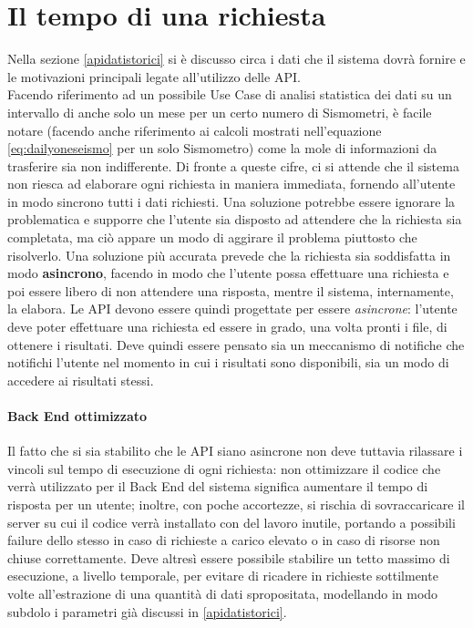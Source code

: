 \section{Il tempo di una richiesta} \label{moledati}
Nella sezione \ref{apidatistorici} si è discusso circa i dati che il sistema dovrà fornire e le motivazioni principali legate all'utilizzo delle API. \\
Facendo riferimento ad un possibile Use Case di analisi statistica dei dati su un intervallo di anche solo un mese per un certo numero di Sismometri, è facile notare (facendo anche riferimento ai calcoli mostrati nell'equazione \ref{eq:dailyoneseismo} per un solo Sismometro) come la mole di informazioni da trasferire sia non indifferente.
Di fronte a queste cifre, ci si attende che il sistema non riesca ad elaborare ogni richiesta in maniera immediata, fornendo all'utente in modo sincrono tutti i dati richiesti. Una soluzione potrebbe essere ignorare la problematica e supporre che l'utente sia disposto ad attendere che la richiesta sia completata, ma ciò appare un modo di aggirare il problema piuttosto che risolverlo. Una soluzione più accurata prevede che la richiesta sia soddisfatta in modo \textbf{asincrono}, facendo in modo che l'utente possa effettuare una richiesta e poi essere libero di non attendere una risposta, mentre il sistema, internamente, la elabora. Le API devono essere quindi progettate per essere \textit{asincrone}: l'utente deve poter effettuare una richiesta ed essere in grado, una volta pronti i file, di ottenere i risultati. Deve quindi essere pensato sia un meccanismo di notifiche che notifichi l'utente nel momento in cui i risultati sono disponibili, sia un modo di accedere ai risultati stessi.

\paragraph{Back End ottimizzato}
Il fatto che si sia stabilito che le API siano asincrone non deve tuttavia rilassare i vincoli sul tempo di esecuzione di ogni richiesta: non ottimizzare il codice che verrà utilizzato per il Back End del sistema significa aumentare il tempo di risposta per un utente; inoltre, con poche accortezze, si rischia di sovraccaricare il server su cui il codice verrà installato con del lavoro inutile, portando a possibili failure dello stesso in caso di richieste a carico elevato o in caso di risorse non chiuse correttamente. Deve altresì essere possibile stabilire un tetto massimo di esecuzione, a livello temporale, per evitare di ricadere in richieste sottilmente volte all'estrazione di una quantità di dati spropositata, modellando in modo subdolo i parametri già discussi in \ref{apidatistorici}. 